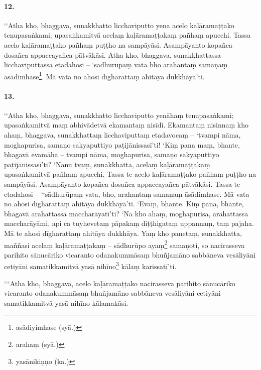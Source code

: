 \paragraph{12.} ‘‘Atha kho, bhaggava, sunakkhatto licchaviputto yena acelo kaḷāramaṭṭako tenupasaṅkami; upasaṅkamitvā acelaṃ kaḷāramaṭṭakaṃ pañhaṃ apucchi. Tassa acelo kaḷāramaṭṭako pañhaṃ puṭṭho na sampāyāsi. Asampāyanto kopañca dosañca appaccayañca pātvākāsi. Atha kho, bhaggava, sunakkhattassa licchaviputtassa etadahosi – ‘sādhurūpaṃ vata bho arahantaṃ samaṇaṃ āsādimhase\footnote{asādiyimhase (syā.)}. Mā vata no ahosi dīgharattaṃ ahitāya dukkhāyā’ti.

\paragraph{13.} ‘‘Atha kho, bhaggava, sunakkhatto licchaviputto yenāhaṃ tenupasaṅkami; upasaṅkamitvā maṃ abhivādetvā ekamantaṃ nisīdi. Ekamantaṃ nisinnaṃ kho ahaṃ, bhaggava, sunakkhattaṃ licchaviputtaṃ etadavocaṃ – ‘tvampi nāma, moghapurisa, samaṇo sakyaputtiyo paṭijānissasī’ti! ‘Kiṃ pana maṃ, bhante, bhagavā evamāha – tvampi nāma, moghapurisa, samaṇo sakyaputtiyo paṭijānissasī’ti? ‘Nanu tvaṃ, sunakkhatta, acelaṃ kaḷāramaṭṭakaṃ upasaṅkamitvā pañhaṃ apucchi. Tassa te acelo kaḷāramaṭṭako pañhaṃ puṭṭho na sampāyāsi. Asampāyanto kopañca dosañca appaccayañca pātvākāsi. Tassa te etadahosi – ‘‘sādhurūpaṃ vata, bho, arahantaṃ samaṇaṃ āsādimhase. Mā vata no ahosi dīgharattaṃ ahitāya dukkhāyā’ti. ‘Evaṃ, bhante. Kiṃ pana, bhante, bhagavā arahattassa maccharāyatī’ti? ‘Na kho ahaṃ, moghapurisa, arahattassa maccharāyāmi, api ca tuyhevetaṃ pāpakaṃ diṭṭhigataṃ uppannaṃ, taṃ pajaha. Mā te ahosi dīgharattaṃ ahitāya dukkhāya. Yaṃ kho panetaṃ, sunakkhatta, maññasi acelaṃ kaḷāramaṭṭakaṃ – sādhurūpo ayaṃ\footnote{arahaṃ (syā.)} samaṇoti, so nacirasseva parihito sānucāriko vicaranto odanakummāsaṃ bhuñjamāno sabbāneva vesāliyāni cetiyāni samatikkamitvā yasā nihīno\footnote{yasānikiṇṇo (ka.)} kālaṃ karissatī’ti.

‘‘‘Atha kho, bhaggava, acelo kaḷāramaṭṭako nacirasseva parihito sānucāriko vicaranto odanakummāsaṃ bhuñjamāno sabbāneva vesāliyāni cetiyāni samatikkamitvā yasā nihīno kālamakāsi.

